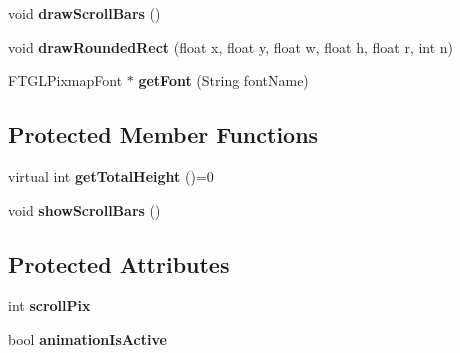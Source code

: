 \begin{DoxyCompactItemize}
\item 
\hypertarget{classOpenGLCanvas_a55f0ace5fb7461fa9eda94f2bd15b717}{void {\bfseries draw\-Scroll\-Bars} ()}\label{classOpenGLCanvas_a55f0ace5fb7461fa9eda94f2bd15b717}

\item 
\hypertarget{classOpenGLCanvas_afcbdde80a35a50b717b4205642cead9c}{void {\bfseries draw\-Rounded\-Rect} (float x, float y, float w, float h, float r, int n)}\label{classOpenGLCanvas_afcbdde80a35a50b717b4205642cead9c}

\item 
\hypertarget{classOpenGLCanvas_af0d4f85ca66ce079a2b098868f49dc04}{F\-T\-G\-L\-Pixmap\-Font $\ast$ {\bfseries get\-Font} (String font\-Name)}\label{classOpenGLCanvas_af0d4f85ca66ce079a2b098868f49dc04}

\end{DoxyCompactItemize}
\subsection*{Protected Member Functions}
\begin{DoxyCompactItemize}
\item 
\hypertarget{classOpenGLCanvas_a68baeb2eb35fb41ad89dbfc55e8a007e}{virtual int {\bfseries get\-Total\-Height} ()=0}\label{classOpenGLCanvas_a68baeb2eb35fb41ad89dbfc55e8a007e}

\item 
\hypertarget{classOpenGLCanvas_a0cb901644481e0328d043011ea3f1af6}{void {\bfseries show\-Scroll\-Bars} ()}\label{classOpenGLCanvas_a0cb901644481e0328d043011ea3f1af6}

\end{DoxyCompactItemize}
\subsection*{Protected Attributes}
\begin{DoxyCompactItemize}
\item 
\hypertarget{classOpenGLCanvas_a5bf50c5ef28423e92e8e22b2d7beb60b}{int {\bfseries scroll\-Pix}}\label{classOpenGLCanvas_a5bf50c5ef28423e92e8e22b2d7beb60b}

\item 
\hypertarget{classOpenGLCanvas_a48925b61ea3317a3847909ba2c827cc7}{bool {\bfseries animation\-Is\-Active}}\label{classOpenGLCanvas_a48925b61ea3317a3847909ba2c827cc7}

\end{DoxyCompactItemize}
